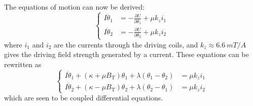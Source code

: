 \documentclass{article}
\begin{document}
The equations of motion can now be derived:
\begin{equation*}
  \begin{cases}
    I\ddot{\theta}_1 &= -\frac{\partial U}{\partial \theta_1} + \mu k_z i_1 \\
    I\ddot{\theta}_2 &= -\frac{\partial U}{\partial \theta_2} + \mu k_z i_2
  \end{cases}
\end{equation*}
where $i_1$ and $i_2$ are the currents through the driving coils, and $k_z \approx \qty{6.6}{mT/A}$ gives the driving field strength generated by a current. These equations can be rewritten as
\begin{equation*}
  \begin{cases}
    I\ddot{\theta}_1 + (\kappa + \mu B_\text{T})\theta_1 + \lambda(\theta_1 - \theta_2) &= \mu k_z i_1\\
    I\ddot{\theta}_2 + (\kappa - \mu B_\text{T})\theta_2 + \lambda(\theta_2 - \theta_1) &= \mu k_z i_2
  \end{cases}
\end{equation*}
which are seen to be coupled differential equations.
\end{document}
